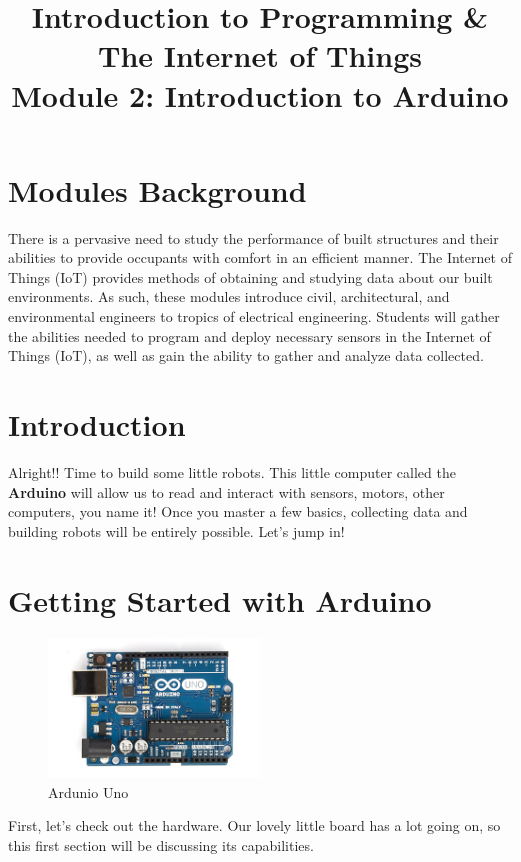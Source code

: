 \documentclass[a4paper]{article}
\title{ \textbf{Introduction to Programming \& The Internet of Things} \\
Module 2: Introduction to Arduino \vspace{-5ex} \\
}
\date{}
\begin{document}
\maketitle
\thispagestyle{fancy}

\section{Modules Background}
There is a pervasive need to study the performance of built structures and their abilities to provide occupants with comfort in an efficient manner. The Internet of Things (IoT) provides methods of obtaining and studying data about our built environments. As such, these modules introduce civil, architectural, and environmental engineers to tropics of electrical engineering. Students will gather the abilities needed to program and deploy necessary sensors in the Internet of Things (IoT), as well as gain the ability to gather and analyze data collected.

\tableofcontents
\newpage

\section{Introduction}
\label{sec:introduction}

Alright!! Time to build some little robots. This little computer called the \textbf{Arduino} will allow us to read and interact with sensors, motors, other computers, you name it! Once you master a few basics, collecting data and building robots will be entirely possible. Let's jump in!

\section{Getting Started with Arduino}
\label{fig:arduino}
\begin{figure}
  \begin{center}
    \includegraphics[width=0.5\textwidth]{1-6.jpg}
  \end{center}
  \caption{Ardunio Uno}
\end{figure}
\label{sec:starting}
First, let's check out the hardware. Our lovely little board has a lot going on, so this first section will be discussing its capabilities.
\end{document}
